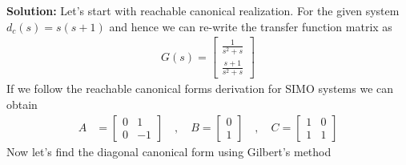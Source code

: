 \documentclass[twoside]{article}
\begin{document}
\textbf{Solution:} Let's start with reachable canonical realization. For the given system $d_c(s) = s(s+1)$ and hence we can re-write the 
transfer function matrix as
%
\begin{align*}
	G(s) =  \left[ \begin{array}{cc} \frac{ 1 }{ s^2 + s }  
	       \\ \frac{ s+1 }{ s^2 + s}   \end{array} \right] 
\end{align*}
%  
If we follow the reachable canonical forms derivation for SIMO systems we can obtain
%
%
\begin{align*}
A &= \left[ \begin{array}{ccc} 0 & 1 \\ 0 & -1  \end{array} \right]
\quad , \quad 
B = \left[ \begin{array}{c} 0 \\  1 \end{array} \right]
\quad , \quad 
	C = \left[ \begin{array}{cc} 1  & 0
	       \\  1  &  1  \end{array} \right]
\end{align*}
% 
Now let's find the diagonal canonical form using Gilbert's method
\end{document}
